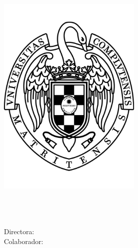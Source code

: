 
\begin{titlepage}

\begin{addmargin}[-1cm]{-3cm}
\begin{center}
\large

\hfill
\vfill

\begingroup
\color{Maroon} \\
\color{Maroon} \\
\bigskip %
\endgroup

\spacedlowsmallcaps{\myName} %

\vfill

\includegraphics[width=7cm]{Imagenes/escudoUCM} \\ \medskip %


\myTitle
\xspace

\mySubtitle \medskip %
\myDegree \\
\myFaculty \\
\myUni \\ 
Directora: \myProf \\
Colaborador: \myOtherProf \\
\bigskip

\myTime

\vfill

\end{center}
\end{addmargin}

\end{titlepage}

